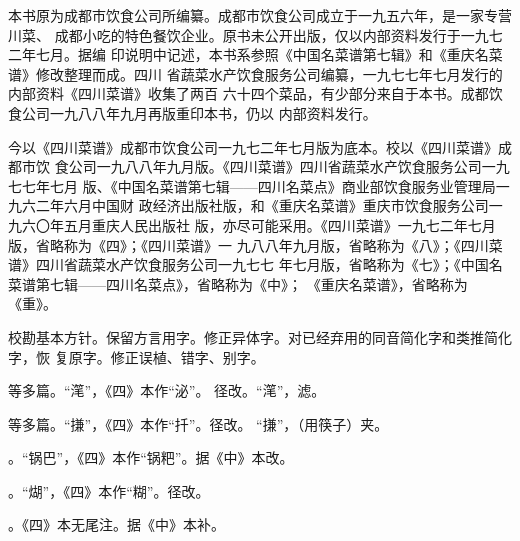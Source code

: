 \vspace{.6875\baselineskip}%
\begin{list}{}{%
	\setlength{\topsep}{0pt}%
	\setlength{\leftmargin}{1.5bp}%
	\setlength{\rightmargin}{1.5bp}%
	\setlength{\listparindent}{\parindent}%
	\setlength{\itemindent}{\parindent}%
	\setlength{\parsep}{\parskip}%
}%
\item[]%

本书原为成都市饮食公司所编纂。成都市饮食公司成立于一九五六年，是一家专营川菜、
成都小吃的特色餐饮企业。原书未公开出版，仅以内部资料发行于一九七二年七月。据编
印说明中记述，本书系参照《中国名菜谱第七辑》和《重庆名菜谱》修改整理而成。四川
省蔬菜水产饮食服务公司编纂，一九七七年七月发行的内部资料《四川菜谱》收集了两百
六十四个菜品，有少部分来自于本书。成都饮食公司一九八八年九月再版重印本书，仍以
内部资料发行。

今以《四川菜谱》成都市饮食公司一九七二年七月版为底本。校以《四川菜谱》成都市饮
食公司一九八八年九月版。《四川菜谱》四川省蔬菜水产饮食服务公司一九七七年七月
版、《中国名菜谱第七辑——四川名菜点》商业部饮食服务业管理局一九六二年六月中国财
政经济出版社版，和《重庆名菜谱》重庆市饮食服务公司一九六〇年五月重庆人民出版社
版，亦尽可能采用。《四川菜谱》一九七二年七月版，省略称为《四》；《四川菜谱》一
九八八年九月版，省略称为《八》；《四川菜谱》四川省蔬菜水产饮食服务公司一九七七
年七月版，省略称为《七》；《中国名菜谱第七辑——四川名菜点》，省略称为《中》；
《重庆名菜谱》，省略称为《重》。

校勘基本方针。保留方言用字。修正异体字。对已经弃用的同音简化字和类推简化字，恢
复原字。修正误植、错字、别字。

\vspace{.5\baselineskip plus .5\baselineskip minus .5\baselineskip}%
{\noindent\null\hfill{}\hfill\null}%
\vspace{1\baselineskip plus .5\baselineskip minus .5\baselineskip}%

等多篇。“滗”，《四》本作“泌”。
径改。“滗”，滤。

等多篇。“搛”，《四》本作“扦”。径改。
“搛”，（用筷子）夹。

。“锅巴”，《四》本作“锅粑”。据《中》本改。

。“煳”，《四》本作“糊”。径改。

。《四》本无尾注{\footnotesize{}}。据《中》本补。


\end{list}
